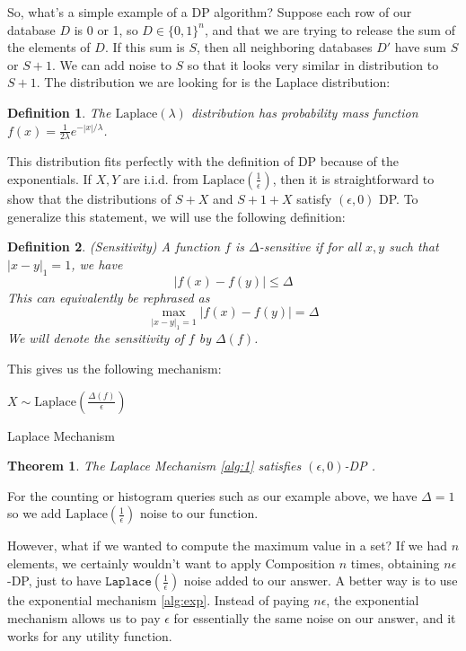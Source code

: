 \documentclass[11pt]{article}
\newtheorem{theorem}{Theorem}
\newtheorem{defn}{Definition}
\begin{document}
So, what's a simple example of a DP algorithm? Suppose each row of our database $D$ is 0 or 1, so $D \in \{0, 1\}^n$, and that we are trying to release the sum of the elements of $D$. If this sum is $S$, then all neighboring databases $D'$ have sum $S$ or $S+1$. We can add noise to $S$ so that it looks very similar in distribution to $S+1$. The distribution we are looking for is the Laplace distribution:
\begin{defn}
The $\text{Laplace}(\lambda)$ distribution has probability mass function $f(x) = \frac{1}{2\lambda}e^{-|x|/\lambda}$.
\end{defn}
This distribution fits perfectly with the definition of DP because of the exponentials. If $X,Y$ are i.i.d. from $\text{Laplace}\left(\frac{1}{\epsilon}\right)$, then it is straightforward to show that the distributions of $S+X$ and $S+1+X$ satisfy $(\epsilon, 0)$ DP. To generalize this statement, we will use the following definition:
\begin{defn}
(Sensitivity) A function $f$ is $\Delta$-sensitive if for all $x,y$ such that $|x-y|_1 = 1$, we have 
\[
|f(x) - f(y)| \leq \Delta
\]
This can equivalently be rephrased as 
\[
\max_{|x-y|_1=1}|f(x) - f(y)| = \Delta
\]
We will denote the sensitivity of $f$ by $\Delta(f)$.
\end{defn}
This gives us the following mechanism:

\begin{algorithm}\label{alg:1}
\SetAlgoLined
{}
$X \sim \text{Laplace}\left(\frac{\Delta(f)}{\epsilon}\right)$\;
\caption{Laplace Mechanism}
\end{algorithm}

\begin{theorem}
The Laplace Mechanism \ref{alg:1} satisfies $(\epsilon, 0)$-DP \cite{Dwork:2006}.
\end{theorem}
For the counting or histogram queries such as our example above, we have $\Delta = 1$ so we add $\text{Laplace}\left(\frac{1}{\epsilon}\right)$ noise to our function.

However, what if we wanted to compute the maximum value in a set? If we had $n$ elements, we certainly wouldn't want to apply Composition $n$ times, obtaining $n\epsilon$-DP, just to have $\texttt{Laplace}\left(\frac{1}{\epsilon}\right)$ noise added to our answer. A better way is to use the exponential mechanism \ref{alg:exp}. Instead of paying $n\epsilon$, the exponential mechanism allows us to pay $\epsilon$ for essentially the same noise on our answer, and it works for any utility function.
\end{document}
